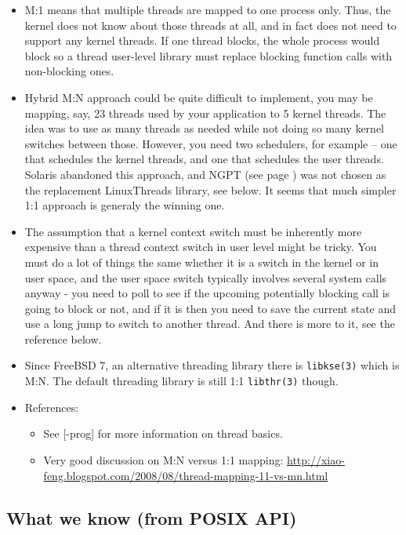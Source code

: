 \begin{itemize}
\item M:1 means that multiple threads are mapped to one process only. Thus, the
kernel does not know about those threads at all, and in fact does not need to
support any kernel threads. If one thread blocks, the whole process would block
so a thread user-level library must replace blocking function calls with
non-blocking ones.
\item Hybrid M:N approach could be quite difficult to implement, you may be
mapping, say, 23 threads used by your application to 5 kernel threads. The idea
was to use as many threads as needed while not doing so many kernel switches
between those. However, you need two schedulers, for example -- one that
schedules the kernel threads, and one that schedules the user threads. Solaris
abandoned this approach, and NGPT (see page \pageref{NGPT}) was not chosen as
the replacement LinuxThreads library, see below. It seems that much simpler 1:1
approach is generaly the winning one.
\item The assumption that a kernel context switch must be inherently more
expensive than a thread context switch in user level might be tricky. You must
do a lot of things the same whether it is a switch in the kernel or in user
space, and the user space switch typically involves several system calls anyway
- you need to poll to see if the upcoming potentially blocking call is going to
block or not, and if it is then you need to save the current state and use a
long jump to switch to another thread. And there is more to it, see the
reference below.
\item Since FreeBSD 7, an alternative threading library there is
\texttt{libkse(3)} which is M:N. The default threading library is still 1:1
\texttt{libthr(3)} though.
\item References:
	\begin{itemize}
	\item See [\myun\myix-prog] for more information on thread basics.
	\item Very good discussion on M:N versus 1:1 mapping:
	\url{http://xiao-feng.blogspot.com/2008/08/thread-mapping-11-vs-mn.html}
	\end{itemize}
\end{itemize}


\subsection{What we know (from POSIX API)}


